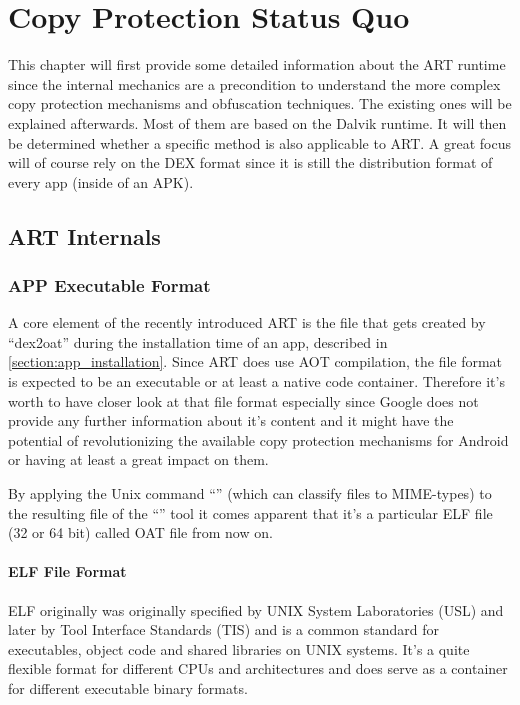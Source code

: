 \chapter{Copy Protection Status Quo}
\label{chapter:copy_protection_status_quo}

This chapter will first provide some detailed information about the ART runtime since the internal mechanics are a precondition to understand the more complex copy protection mechanisms and obfuscation techniques. The existing ones will be explained afterwards. Most of them are based on the Dalvik runtime. It will then be determined whether a specific method is also
applicable to ART. A great focus will of course rely on the DEX format since
it is still the distribution format of every app (inside of an APK).

\section{ART Internals}
\label{section:art_internals}

\subsection{APP Executable Format}\label{section:app_executable_format}

A core element of the recently introduced ART is the file that
gets created by ``dex2oat'' during the installation time of an app,
described in \autoref{section:app_installation}.
Since ART does use AOT compilation, the file format is expected
to be an executable or at least a native code container.
Therefore it's worth to have closer look at that file format
especially since Google does not provide any further information
about it's content and it might have the potential of
revolutionizing the available copy protection mechanisms for
Android or having at least a great impact on them.

By applying the Unix command ``'' (which can classify
files to MIME-types) to the resulting file of the ``''
tool it comes apparent that it's a particular ELF file (32 or 64 bit)
called OAT file from now on.

\subsubsection{ELF File Format}\label{section:elf_file_format}
ELF originally was originally specified by UNIX System Laboratories
(USL) and later by Tool Interface Standards (TIS) and is a common
standard for executables, object code and shared libraries on UNIX
systems. It's a quite flexible format for different CPUs and
architectures and does serve as a container for different
executable binary formats.

